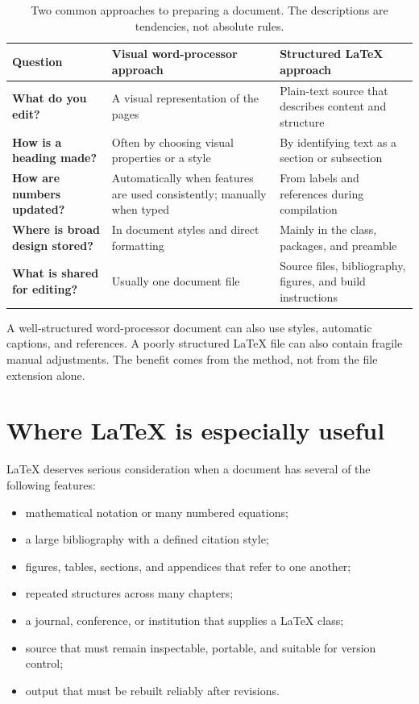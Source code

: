 \begin{table}[htbp]
  \centering
  \caption{Two common approaches to preparing a document. The descriptions
  are tendencies, not absolute rules.}
  \label{tab:workflow-comparison}
  \begin{tabularx}{\textwidth}{@{}
    >{\RaggedRight\arraybackslash\bfseries}p{}
    >{\RaggedRight\arraybackslash}X
    >{\RaggedRight\arraybackslash}X@{}}
    \toprule
    Question & Visual word-processor approach & Structured \LaTeX{} approach \\
    \midrule
    What do you edit? & A visual representation of the pages & Plain-text
      source that describes content and structure \\
    How is a heading made? & Often by choosing visual properties or a style &
      By identifying text as a section or subsection \\
    How are numbers updated? & Automatically when features are used
      consistently; manually when typed & From labels and references during
      compilation \\
    Where is broad design stored? & In document styles and direct formatting &
      Mainly in the class, packages, and preamble \\
    What is shared for editing? & Usually one document file & Source files,
      bibliography, figures, and build instructions \\
    \bottomrule
  \end{tabularx}
\end{table}

A well-structured word-processor document can also use styles, automatic
captions, and references. A poorly structured \LaTeX{} file can also contain
fragile manual adjustments. The benefit comes from the method, not from the
file extension alone.

\section{Where \LaTeX{} is especially useful}

\LaTeX{} deserves serious consideration when a document has several of the
following features:

\begin{itemize}
  \item mathematical notation or many numbered equations;
  \item a large bibliography with a defined citation style;
  \item figures, tables, sections, and appendices that refer to one another;
  \item repeated structures across many chapters;
  \item a journal, conference, or institution that supplies a \LaTeX{} class;
  \item source that must remain inspectable, portable, and suitable for
        version control;
  \item output that must be rebuilt reliably after revisions.
\end{itemize}

